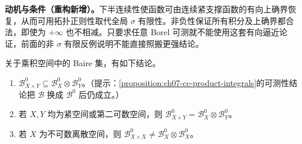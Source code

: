 \documentclass[../../main.tex]{subfiles}
\begin{document}
\begin{remark}
\textbf{动机与条件（重构新增）。}下半连续性使函数可由连续紧支撑函数的有向上确界恢复，从而可用拓扑正则性取代全局 $\sigma$ 有限性。非负性保证所有积分及上确界都合法，即使为 $+\infty$ 也不相减。只要求任意 Borel 可测就不能使用这套有向逼近论证，前面的非 $\sigma$ 有限反例说明不能直接照搬更强结论。
\end{remark}
\begin{exercise}\label{exercise:ch07-product-baire}
关于乘积空间中的 Baire 集，有如下结论。
\begin{enumerate}
\item\label{item:ch07-product-baire-inclusion} $\mathscr B_{X\times Y}^0\subseteq\mathscr B_X^0\otimes\mathscr B_Y^0$。（提示：\cref{proposition:ch07-cc-product-integrals}的可测性结论把 $\mathscr B$ 换成 $\mathscr B^0$ 后仍成立。）
\item\label{item:ch07-product-baire-equality} 若 $X,Y$ 均为紧空间或第二可数空间，则 $\mathscr B_{X\times Y}^0=\mathscr B_X^0\otimes\mathscr B_Y^0$。
\item\label{item:ch07-discrete-product-baire-strict} 若 $X$ 为不可数离散空间，则 $\mathscr B_{X\times X}^0\ne\mathscr B_X^0\otimes\mathscr B_X^0$。
\end{enumerate}
\end{exercise}
\end{document}
